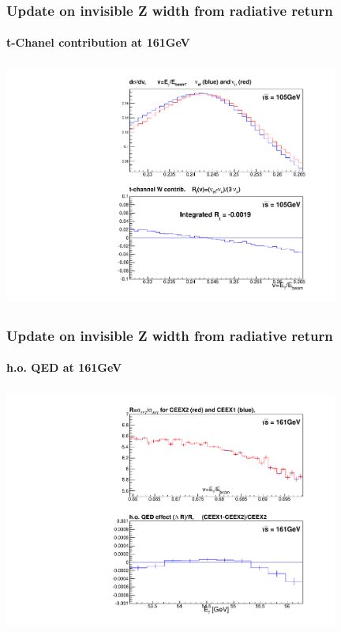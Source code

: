 \documentclass{beamer}
\begin{document}
\begin{frame}[fragile]
\frametitle{\bf Update on invisible Z width from radiative return}
\framesubtitle{\bf\large t-Chanel contribution at 161GeV}

\includegraphics[width=110mm,height=80mm]{./cNuDiff_E105.pdf}
\end{frame}


\begin{frame}[fragile]
\frametitle{\bf Update on invisible Z width from radiative return}
\framesubtitle{\bf\large h.o. QED at 161GeV}

\includegraphics[width=110mm,height=80mm]{./cCeex21rat_E161.pdf}
\end{frame}
\end{document}
